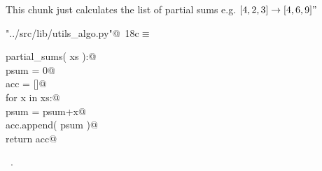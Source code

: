 \documentclass[11.5pt]{report}
\begin{document}
\vspace{-0.8cm}
\newchunk This chunk just calculates the list of partial sums e.g. $[4,2,3] \rightarrow [4,6,9]"$
\begin{flushleft} \small\label{scrap16}\raggedright\small
{} \verb@"../src/lib/utils_algo.py"@\nobreak\ {\footnotesize {18c}}$\equiv$
\vspace{-1ex}
\begin{list}{}{} \item
\mbox{}\verb@def partial_sums( xs ):@\\
\mbox{}\verb@    psum = 0@\\
\mbox{}\verb@    acc = []@\\
\mbox{}\verb@    for x in xs:@\\
\mbox{}\verb@        psum = psum+x@\\
\mbox{}\verb@        acc.append( psum )@\\
\mbox{}\verb@    return acc@\\
\mbox{}\verb@@{\NWsep}
\end{list}
\vspace{-1.5ex}
\footnotesize
\begin{list}{}{\setlength{\itemsep}{-\parsep}\setlength{\itemindent}{-\leftmargin}}
\item \NWtxtFileDefBy\ .

\item{}
\end{list}
\vspace{4ex}
\end{flushleft}
\end{document}
